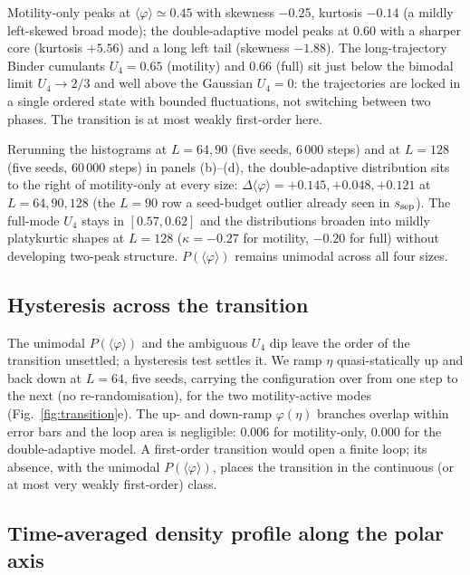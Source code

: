 \documentclass[11pt,a4paper]{article}
\begin{document}
Motility-only peaks at $\langle\varphi\rangle \simeq 0.45$
with skewness $-0.25$, kurtosis $-0.14$ (a mildly left-skewed
broad mode); the double-adaptive model peaks at $0.60$ with
a sharper core (kurtosis $+5.56$) and a long left tail
(skewness $-1.88$). The long-trajectory Binder cumulants
$U_4 = 0.65$ (motility) and $0.66$ (full) sit just below the
bimodal limit $U_4 \to 2/3$ and well above the Gaussian
$U_4 = 0$: the trajectories are locked in a single ordered
state with bounded fluctuations, not switching between two
phases. The transition is at most weakly first-order here.

Rerunning the histograms at $L = 64, 90$ (five seeds,
$6\,000$ steps) and at $L = 128$ (five seeds, $60\,000$
steps) in panels (b)--(d), the double-adaptive distribution
sits to the right of motility-only at every size:
$\Delta\langle\varphi\rangle = +0.145, +0.048, +0.121$ at
$L = 64, 90, 128$ (the $L = 90$ row a seed-budget outlier
already seen in $s_{\rm sep}$). The full-mode $U_4$ stays in
$[0.57, 0.62]$ and the distributions broaden into mildly
platykurtic shapes at $L = 128$ ($\kappa = -0.27$ for
motility, $-0.20$ for full) without developing two-peak
structure. $P(\langle\varphi\rangle)$ remains unimodal across
all four sizes.

\subsection*{Hysteresis across the transition}
\label{sec:hysteresis}

The unimodal $P(\langle\varphi\rangle)$ and the ambiguous
$U_4$ dip leave the order of the transition unsettled; a
hysteresis test settles it. We ramp $\eta$ quasi-statically
up and back down at $L = 64$, five seeds, carrying the
configuration over from one step to the next (no
re-randomisation), for the two motility-active modes
(Fig.~\ref{fig:transition}e). The up- and down-ramp
$\varphi(\eta)$ branches overlap within error bars and the
loop area is negligible: $0.006$ for motility-only,
$0.000$ for the double-adaptive model. A first-order
transition would open a finite loop; its absence, with the
unimodal $P(\langle\varphi\rangle)$, places the transition in
the continuous (or at most very weakly first-order) class.

\subsection*{Time-averaged density profile along the polar axis}
\end{document}
